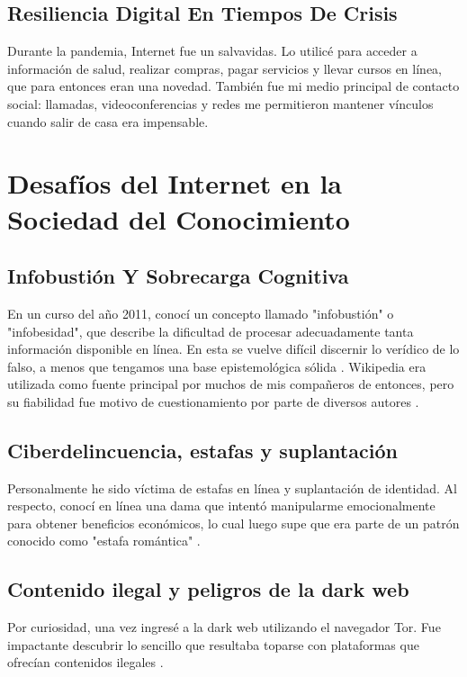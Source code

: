 \documentclass[12pt]{article}
\begin{document}
	\subsection{Resiliencia Digital En Tiempos De Crisis}
	Durante la pandemia, Internet fue un salvavidas. Lo utilicé para acceder a información de salud, realizar compras, pagar servicios y llevar cursos en línea, que para entonces eran una novedad. También fue mi medio principal de contacto social: llamadas, videoconferencias y redes me permitieron mantener vínculos cuando salir de casa era impensable.
	
	\section{Desafíos del Internet en la Sociedad del Conocimiento}
	
	\subsection{Infobustión Y Sobrecarga Cognitiva}
	En un curso del año 2011, conocí un concepto llamado "infobustión" o "infobesidad", que describe la dificultad de procesar adecuadamente tanta información disponible en línea. En esta se vuelve difícil discernir lo verídico de lo falso, a menos que tengamos una base epistemológica sólida  \parencite{cornell2009}. Wikipedia era utilizada como fuente principal por muchos de mis compañeros de entonces, pero su fiabilidad fue motivo de cuestionamiento por parte de diversos autores \parencite{lim2009}.
	
	\subsection{Ciberdelincuencia, estafas y suplantación}
	Personalmente he sido víctima de estafas en línea y suplantación de identidad. Al respecto, conocí en línea una dama que intentó manipularme emocionalmente para obtener beneficios económicos, lo cual luego supe que era parte de un patrón conocido como "estafa romántica" \parencite{interpol2021}.
	
	\subsection{Contenido ilegal y peligros de la dark web}
	Por curiosidad, una vez ingresé a la dark web utilizando el navegador Tor. Fue impactante descubrir lo sencillo que resultaba toparse con plataformas que ofrecían contenidos ilegales \parencite{torproject}.
	
\end{document}
